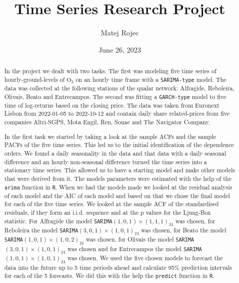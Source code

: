 \documentclass{article}
\title{Time Series Research Project}
\author{Matej Rojec}
\date{June 26, 2023}
\begin{document}
\maketitle
\newpage

\tableofcontents
\listoffigures
\listoftables

\newpage

\begin{abstract}
    In the project we dealt with two tasks.
    The first was modeling five time series of hourly-ground-levels of
    $\text{O}_3$ on an hourly time frame with a \verb|SARIMA-type| model.
    The data was collected at the following stations of the qualar network:  
    Alfragide, Reboleira, Olivais, Beato and Entrecampos.
    The second was fitting a \verb|GARCH-type| model to five time 
    of log-returns based on the closing price.
    The data was taken from Euronext Lisbon from 2022-01-05 to 2022-10-12
    and contain daily share related-prices from five companies 
    Altri-SGPS, Mota Engil, Ren, Sonae and The Navigator Company.
    
    In the first task we started by taking a look at the 
    sample ACFs and the sample PACFs of the five time series. This led us to the
    initial identification of the dependence orders. We found 
    a daily seasonality in the data and that data with 
    a daily seasonal difference and an hourly non-seasonal difference
    turned the time series into a stationary time series. This 
    allowed us to have a starting model and make other models 
    that were derived from it. The models parameters were 
    estimated with the help of the \verb|arima| function in \verb|R|.
    When we had the models made we 
    looked at the residual analysis of each model and the AIC 
    of each model and based on that we chose the final model 
    for each of the five time series. 
    We looked at the sample ACF of the standardised residuals, if they 
    form an i.i.d. sequence and at the p values for the Ljung-Box statistic.
    For Alfragide the model \verb|SARIMA|$(1,0,1) \times (1,1,1)_{24}$ was chosen, 
    for Reboleira the model \verb|SARIMA|$(3,0,1) \times (1,0,1)_{24}$ was chosen,
    for Beato the model \verb|SARIMA|$(1,0,1) \times (1,0,2)_{24}$ was chosen,
    for Olivais the model \verb|SARIMA|$(3,0,1) \times (1,0,1)_{24}$ was chosen and for 
    Entrecampos the model \verb|SARIMA|$(1,0,1) \times (1,0,1)_{24}$ was chosen.
    We used the five chosen models to forecast the data into the future up to 5 time periods
    ahead and calculate 95\% prediction intervals for each of the 5 forecasts. 
    We did this with the help the \verb|predict| function in \verb|R|.


\end{abstract}
\end{document}
